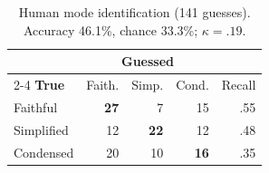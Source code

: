 \begin{table}[t]
    
  \begin{tabular}{lrrrr}
    
    & \multicolumn{3}{c}{\textbf{Guessed}} & \\
    \cmidrule(lr){2-4}
    \textbf{True} & Faith. & Simp. & Cond. & Recall \\
    
    Faithful   & \textbf{27} & 7  & 15 & .55 \\
    Simplified & 12 & \textbf{22} & 12 & .48 \\
    Condensed  & 20 & 10 & \textbf{16} & .35 \\
    
  \end{tabular}
  \caption{Human mode identification (141 guesses). Accuracy 46.1\%,
           chance 33.3\%; $\kappa=.19$.}
  \label{tab:confusion}
\end{table}